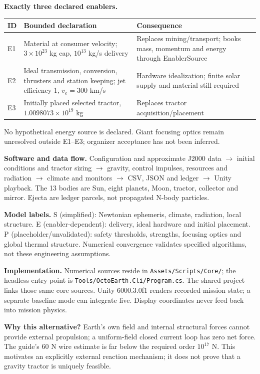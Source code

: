 ﻿\documentclass[10pt,a4paper]{article}
\newcommand{\file}[1]{{\footnotesize\nolinkurl{#1}}}
\begin{document}
\textbf{Exactly three declared enablers.}
\par\smallskip
{\small\noindent\begin{tabularx}{\linewidth}{@{}lXX@{}}\toprule
ID & Bounded declaration & Consequence\\\midrule
E1 & Material at consumer velocity; $3\times10^{23}$ kg cap, $10^{13}$ kg/s delivery & Replaces mining/transport; books mass, momentum and energy through EnablerSource\\
E2 & Ideal transmission, conversion, thrusters and station keeping; jet efficiency 1, $v_e=300$ km/s & Hardware idealization; finite solar supply and material still required\\
E3 & Initially placed selected tractor, $1.0098073\times10^{19}$ kg & Replaces tractor acquisition/placement\\\bottomrule
\end{tabularx}\par}
\smallskip

No hypothetical energy source is declared. Giant focusing optics remain unresolved outside E1--E3; organizer acceptance has not been inferred.

\textbf{Software and data flow.} Configuration and approximate J2000 data $\rightarrow$ initial conditions and tractor sizing $\rightarrow$ gravity, control impulses, resources and radiation $\rightarrow$ climate and monitors $\rightarrow$ CSV, JSON and ledger $\rightarrow$ Unity playback. The 13 bodies are Sun, eight planets, Moon, tractor, collector and mirror. Ejecta are ledger parcels, not propagated N-body particles.

\textbf{Model labels.} S (simplified): Newtonian ephemeris, climate, radiation, local structure. E (enabler-dependent): delivery, ideal hardware and initial placement. P (placeholder/unvalidated): safety thresholds, strengths, focusing optics and global thermal structure. Numerical convergence validates specified algorithms, not these engineering assumptions.

\textbf{Implementation.} Numerical sources reside in \file{Assets/Scripts/Core/}; the headless entry point is \file{Tools/OctoEarth.Cli/Program.cs}. The shared project links those same core sources. Unity 6000.3.0f1 renders recorded mission state; a separate baseline mode can integrate live. Display coordinates never feed back into mission physics.

\textbf{Why this alternative?} Earth's own field and internal structural forces cannot provide external propulsion; a uniform-field closed current loop has zero net force. The guide's 60 N wire estimate is far below the required order $10^{17}$ N. This motivates an explicitly external reaction mechanism; it does not prove that a gravity tractor is uniquely feasible.
\newpage
\end{document}

